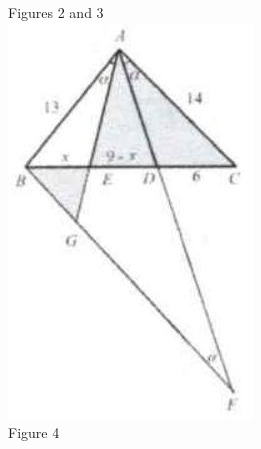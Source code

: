 \documentclass{article}
\begin{document}
Figures 2 and 3\\
\centering
\includegraphics[width=\textwidth]{images/121.jpg}\\
Figure 4
\end{document}
